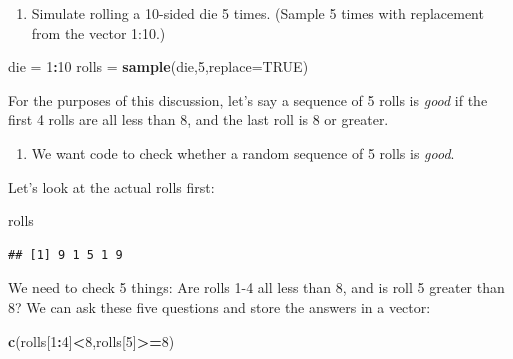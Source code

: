 \documentclass[
]{book}
\newenvironment{Shaded}{\begin{snugshade}}{\end{snugshade}}
\newcommand{\AttributeTok}[1]{\textcolor[rgb]{0.13,0.29,0.53}{#1}}
\newcommand{\ConstantTok}[1]{\textcolor[rgb]{0.56,0.35,0.01}{#1}}
\newcommand{\DecValTok}[1]{\textcolor[rgb]{0.00,0.00,0.81}{#1}}
\newcommand{\FunctionTok}[1]{\textcolor[rgb]{0.13,0.29,0.53}{\textbf{#1}}}
\newcommand{\NormalTok}[1]{#1}
\newcommand{\OtherTok}[1]{\textcolor[rgb]{0.56,0.35,0.01}{#1}}
\newcommand{\SpecialCharTok}[1]{\textcolor[rgb]{0.81,0.36,0.00}{\textbf{#1}}}
\providecommand{\tightlist}{%
  \setlength{\itemsep}{0pt}\setlength{\parskip}{0pt}}
\theoremstyle{definition}
\theoremstyle{definition}
\theoremstyle{definition}
\theoremstyle{definition}
\theoremstyle{remark}
\begin{document}
\begin{enumerate}
\def\labelenumi{\arabic{enumi}.}
\tightlist
\item
  Simulate rolling a 10-sided die 5 times. (Sample 5 times with replacement from the vector 1:10.)
\end{enumerate}

\begin{Shaded}
\begin{Highlighting}[]
\NormalTok{die }\OtherTok{=} \DecValTok{1}\SpecialCharTok{:}\DecValTok{10}
\NormalTok{rolls }\OtherTok{=} \FunctionTok{sample}\NormalTok{(die,}\DecValTok{5}\NormalTok{,}\AttributeTok{replace=}\ConstantTok{TRUE}\NormalTok{)}
\end{Highlighting}
\end{Shaded}

For the purposes of this discussion, let's say a sequence of 5 rolls is \emph{good} if the first 4 rolls are all less than 8, and the last roll is 8 or greater.

\begin{enumerate}
\def\labelenumi{\arabic{enumi}.}
\setcounter{enumi}{1}
\tightlist
\item
  We want code to check whether a random sequence of 5 rolls is \emph{good}.
\end{enumerate}

Let's look at the actual rolls first:

\begin{Shaded}
\begin{Highlighting}[]
\NormalTok{rolls}
\end{Highlighting}
\end{Shaded}

\begin{verbatim}
## [1] 9 1 5 1 9
\end{verbatim}

We need to check 5 things: Are rolls 1-4 all less than 8, and is roll 5 greater than 8? We can ask these five questions and store the answers in a vector:

\begin{Shaded}
\begin{Highlighting}[]
\FunctionTok{c}\NormalTok{(rolls[}\DecValTok{1}\SpecialCharTok{:}\DecValTok{4}\NormalTok{]}\SpecialCharTok{\textless{}}\DecValTok{8}\NormalTok{,rolls[}\DecValTok{5}\NormalTok{]}\SpecialCharTok{\textgreater{}=}\DecValTok{8}\NormalTok{)}
\end{Highlighting}
\end{Shaded}
\end{document}
